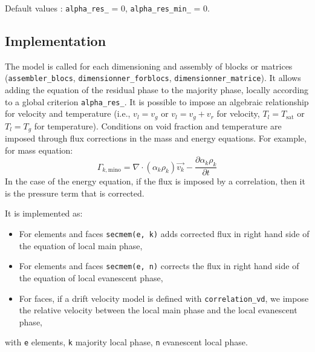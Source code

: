 Default values : \texttt{alpha\_res\_} = 0, \texttt{alpha\_res\_min\_} = 0.

\subsection{Implementation}

The model is called for each dimensioning and assembly of blocks or matrices (\texttt{assembler\_blocs}, \texttt{dimensionner\_forblocs}, \texttt{dimensionner\_matrice}). 
It allows adding the equation of the residual phase to the majority phase, locally according to a global criterion \texttt{alpha\_res\_}. 
It is possible to impose an algebraic relationship for velocity and temperature (i.e., $v_l = v_g$ or $v_l = v_g + v_r$ for velocity, $T_l = T_{\text{sat}}$ or $T_l = T_g$ for temperature). 
Conditions on void fraction and temperature are imposed through flux corrections in the mass and energy equations. 
For example, for mass equation:
\begin{equation}
\Gamma_{k,\text{mino}}=\nabla \cdot (\alpha_k\rho_k)\overrightarrow{v_k} - \frac{\partial \alpha_k\rho_k}{\partial t}
\end{equation}
In the case of the energy equation, if the flux is imposed by a correlation, then it is the pressure term that is corrected.

It is implemented as:
\begin{itemize}
\item[\small \textcolor{blue}{\ding{109}}]For elements and faces \texttt{secmem(e, k)} adds corrected flux in right hand side of the equation of local main phase,
\item[\small \textcolor{blue}{\ding{109}}]For elements and faces \texttt{secmem(e, n)} corrects the flux in right hand side of the equation of local evanescent phase,
\item[\small \textcolor{blue}{\ding{109}}]For faces, if a drift velocity model is defined with \texttt{correlation\_vd}, we impose the relative velocity between the local main phase and the local evanescent phase,
\end{itemize}
with \texttt{e} elements, \texttt{k} majority local phase, \texttt{n} evanescent local phase.

